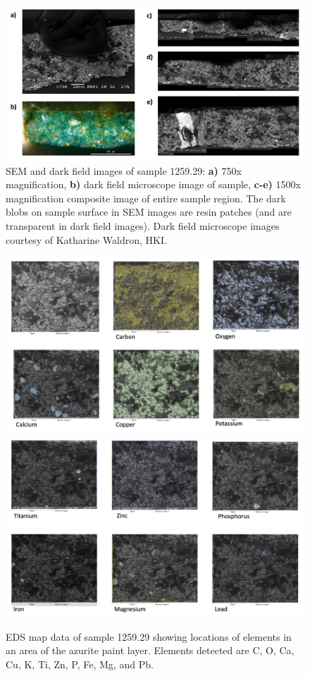 \begin{figure}[H]
  \centering
  \includegraphics[width=\linewidth]{1259-29_imgs}
\caption[SEM and dark field images of sample 1259.29.]{SEM and dark field images of sample 1259.29: \textbf{a)} 750x magnification, \textbf{b)} dark field microscope image of sample, \textbf{c-e)} 1500x magnification composite image of entire sample region. The dark blobs on sample surface in SEM images are resin patches (and are transparent in dark field images). Dark field microscope images courtesy of Katharine Waldron, HKI.}
\label{fig:1259.29_imgs}
\end{figure}

\begin{figure}[H]
\centering
\begin{minipage}[t]{\linewidth}
  \centering
  \includegraphics[width=0.9\linewidth]{1259-29_mapdata_1}
\hfill
\includegraphics[width=0.9\linewidth]{1259-29_mapdata_2}
\hfill
\end{minipage}
\caption[EDS map data, sample 1259.29.]{EDS map data of sample 1259.29 showing locations of elements in an area of the azurite paint layer. Elements detected are C, O, Ca, Cu, K, Ti, Zn, P, Fe, Mg, and Pb.}
\label{fig:1259.29_mapdata}
\end{figure}


